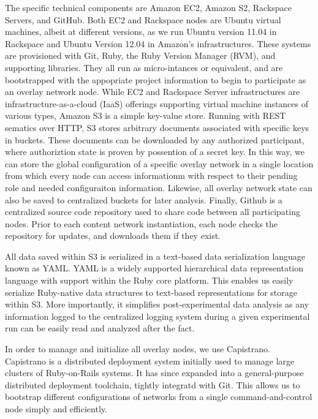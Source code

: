 The specific technical components are Amazon EC2, Amazon S2, Rackspace Servers, and GitHub.  Both EC2 and Rackspace nodes are Ubuntu virtual machines, albeit at different versions, as we run Ubuntu version 11.04 in Rackspace and Ubuntu Version 12.04 in Amazon's infrastructures.  These systems are provisioned with Git, Ruby, the Ruby Version Manager (RVM), and supporting libraries.  They all run as micro-intances or equivalent, and are bootstrapped with the appopriate project information to begin to participate as an overlay network node.  While EC2 and Rackspace Server infrastructures are infrastructure-as-a-cloud (IaaS) offerings supporting virtual machine instances of various types, Amazon S3 is a simple key-value store.  Running with REST sematics over HTTP, S3 stores arbitrary documents associated with specific keys in buckets.  These documents can be downloaded by any authorized participant, where authoriztion state is proven by possention of a secret key.  In this way, we can store the global configuration of a specific overlay network in a single location from which every node can access informationm with respect to their pending role and needed configuraiton information.  Likewise, all overlay network state can also be saved to centralized buckets for later analysis.  Finally, Github is a centralized source code repository used to share code between all participating nodes.  Prior to each content network instantiation, each node checks the repository for updates, and downloads them if they exist.

All data saved within S3 is serialized in a text-based data serialization language known as YAML.  YAML is a widely supported hierarchical data representation language with support within the Ruby core platform.  This enables us easily serialize Ruby-native data structures to text-based representations for storage within S3.  More importantly, it simplifies post-experimental data analysis as any information logged to the centralized logging system during a given experimental run can be easily read and analyzed after the fact.

In order to manage and initialize all overlay nodes, we use Capistrano.  Capistrano is a distributed deployment system initially used to manage large clusters of Ruby-on-Rails systems.  It has since expanded into a general-purpose distributed deployment toolchain, tightly integratd with Git.  This allows us to bootstrap different configurations of networks from a single command-and-control node simply and efficiently.

